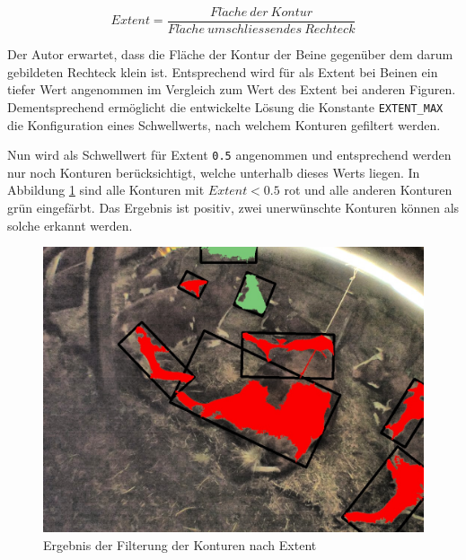 \begin{equation}\label{Extent}
Extent =  \frac{Fl\ddot{a}che\ der\ Kontur}{Fl\ddot{a}che\  umschliessendes\  Rechteck}  
\end{equation}

Der Autor erwartet, dass die Fläche der Kontur der Beine gegenüber dem darum gebildeten Rechteck klein ist. Entsprechend wird für als Extent bei Beinen ein tiefer Wert angenommen im Vergleich zum Wert des Extent bei anderen Figuren. Dementsprechend ermöglicht die entwickelte Lösung die Konstante \texttt{EXTENT_MAX} die Konfiguration eines Schwellwerts, nach welchem Konturen gefiltert werden. 

Nun wird als Schwellwert für Extent \texttt{0.5} angenommen und entsprechend werden nur noch Konturen berücksichtigt, welche unterhalb dieses Werts liegen. In Abbildung \ref{fig: Ergebnis der Filterung der Konturen nach Extent} sind alle Konturen mit ${Extent < 0.5}$ rot und alle anderen Konturen grün eingefärbt. Das Ergebnis ist positiv, zwei unerwünschte Konturen können als solche erkannt werden.
\begin{figure}[H]
	\center
	\includegraphics[scale=0.43]{Grafiken/entwicklung/23FilteringExtent.jpg}
	\caption{Ergebnis der Filterung der Konturen nach Extent } 
	\label{fig: Ergebnis der Filterung der Konturen nach Extent} 
\end{figure}

